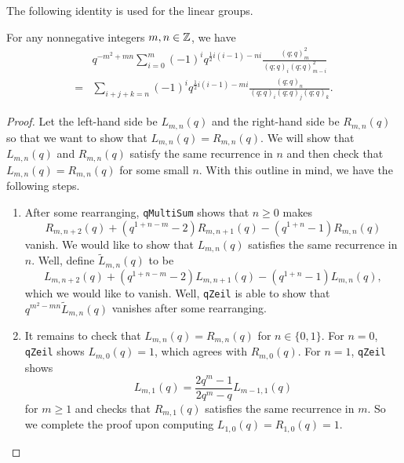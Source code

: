 The following identity is used for the linear groups.
\begin{proposition} \label{prop:gl-q-identity}
    For any nonnegative integers $m,n\in\mathbb Z$, we have
    \begin{align*}
        &q^{-m^{2}+mn}\sum_{i=0}^{m}\left(-1\right)^{i}q^{\frac{1}{2}i\left(i-1\right)-ni}\frac{\left(q;q\right)_m^{2}}{\left(q;q\right)_i\left(q;q\right)_{m-i}^{2}} \\
        ={}&\sum_{i+j+k=n}\left(-1\right)^{i}q^{\frac{1}{2}i\left(i-1\right)-mi}\frac{\left(q;q\right)_n}{\left(q;q\right)_i\left(q;q\right)_j\left(q;q\right)_k}.
    \end{align*}
\end{proposition}
\begin{proof}
    Let the left-hand side be $L_{m,n}(q)$ and the right-hand side be $R_{m,n}(q)$ so that we want to show that $L_{m,n}(q)=R_{m,n}(q)$. We will show that $L_{m,n}(q)$ and $R_{m,n}(q)$ satisfy the same recurrence in $n$ and then check that $L_{m,n}(q)=R_{m,n}(q)$ for some small $n$. With this outline in mind, we have the following steps.
    \begin{enumerate}
        \item After some rearranging, \texttt{qMultiSum} shows that $n\ge0$ makes
        \[R_{m,n+2}\left(q\right)+\left(q^{1+n-m}-2\right)R_{m,n+1}\left(q\right)-\left(q^{1+n}-1\right)R_{m,n}\left(q\right)\]
        vanish. We would like to show that $L_{m,n}(q)$ satisfies the same recurrence in $n$. Well, define $\widetilde L_{m,n}(q)$ to be
        \[L_{m,n+2}\left(q\right)+\left(q^{1+n-m}-2\right)L_{m,n+1}\left(q\right)-\left(q^{1+n}-1\right)L_{m,n}\left(q\right),\]
        which we would like to vanish. Well, \texttt{qZeil} is able to show that $q^{m^2-mn}\widetilde L_{m,n}(q)$ vanishes after some rearranging.
        \item It remains to check that $L_{m,n}(q)=R_{m,n}(q)$ for $n\in\{0,1\}$. For $n=0$, \texttt{qZeil} shows $L_{m,0}(q)=1$, which agrees with $R_{m,0}(q)$. For $n=1$, \texttt{qZeil} shows
        \[L_{m,1}(q)=\frac{2q^m-1}{2q^m-q}L_{m-1,1}(q)\]
        for $m\ge1$ and checks that $R_{m,1}(q)$ satisfies the same recurrence in $m$. So we complete the proof upon computing $L_{1,0}(q)=R_{1,0}(q)=1$.
        \qedhere
    \end{enumerate}
\end{proof}
